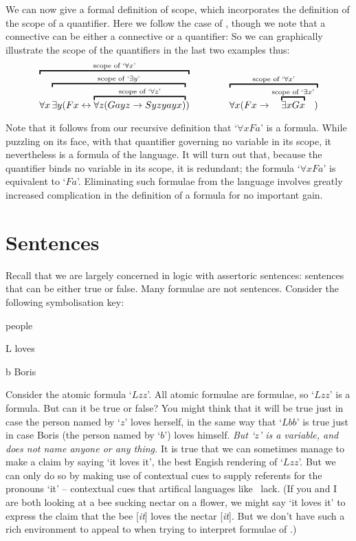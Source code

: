 We can now give a formal definition of scope, which incorporates the definition of the scope of a quantifier. Here we follow the case of \TFL, though we note that a connective can be either a connective or a quantifier:
So we can graphically illustrate the scope of the quantifiers in the last two examples thus:
	$$\overbracket{\forall x \overbracket{\exists y (Fx \eiff \overbracket{\forall z (Gayz \eif Syzyayx)}^{\text{scope of `}\forall z\text{'}}}^{\text{scope of `}\exists y\text{'}})}^{\text{scope of `}\forall x\text{'}} \qquad\qquad 
\overbracket{\forall x (Fx \to \overbracket{\exists x Gx}^{\text{scope of `$\exists x$'}})}^{\text{scope of `$\forall x$'}}	$$

Note that it follows from our recursive definition that `$\forall x Fa$' is a formula. While puzzling on its face, with that quantifier governing no variable in its scope, it nevertheless is a formula of the language. It will turn out that, because the quantifier binds no variable in its scope, it is redundant; the formula `$\forall xFa$' is equivalent to `$Fa$'. Eliminating such formulae from the language involves greatly increased complication in the definition of a formula for no important gain.

\section{Sentences}
Recall that we are largely concerned in logic with assertoric sentences: sentences that can be either true or false. Many formulae are not sentences. Consider the following symbolisation key:
	\begin{ekey}
		\item[\text{domain}] people
		\item[L]  loves 
		\item[b] Boris
	\end{ekey}
Consider the atomic formula `$Lzz$'. All atomic formulae are formulae, so `$Lzz$' is a formula. But can it be true or false? You might think that it will be true just in case the person named by `$z$' loves herself, in the same way that `$Lbb$' is true just in case Boris (the person named by `$b$') loves himself. \emph{But `$z$' is a variable, and does not name anyone or any thing.} It is true that we can sometimes manage to make a claim by saying `it loves it', the best Engish rendering of `$Lzz$'. But we can only do so by making use of contextual cues to supply referents for the pronouns `it' – contextual cues that artifical languages like \FOL\ lack. (If you and I are both looking at a bee sucking nectar on a flower, we might say `it loves it' to express the claim that the bee [\emph{it}]  loves the nectar [\emph{it}]. But we don't have such a rich environment to appeal to when trying to interpret formulae of \FOL.)

